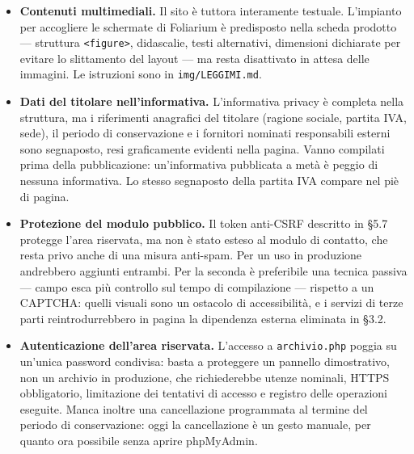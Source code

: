 \documentclass[
  11pt,
]{article}
\providecommand{\tightlist}{%
  \setlength{\itemsep}{0pt}\setlength{\parskip}{0pt}}
\begin{document}
\begin{itemize}
\tightlist
\item
  \textbf{Contenuti multimediali.} Il sito è tuttora interamente
  testuale. L'impianto per accogliere le schermate di Foliarium è
  predisposto nella scheda prodotto --- struttura
  \texttt{\textless{}figure\textgreater{}}, didascalie, testi
  alternativi, dimensioni dichiarate per evitare lo slittamento del
  layout --- ma resta disattivato in attesa delle immagini. Le
  istruzioni sono in \texttt{img/LEGGIMI.md}.
\item
  \textbf{Dati del titolare nell'informativa.} L'informativa privacy è
  completa nella struttura, ma i riferimenti anagrafici del titolare
  (ragione sociale, partita IVA, sede), il periodo di conservazione e i
  fornitori nominati responsabili esterni sono segnaposto, resi
  graficamente evidenti nella pagina. Vanno compilati prima della
  pubblicazione: un'informativa pubblicata a metà è peggio di nessuna
  informativa. Lo stesso segnaposto della partita IVA compare nel piè di
  pagina.
\item
  \textbf{Protezione del modulo pubblico.} Il token anti-CSRF descritto
  in §5.7 protegge l'area riservata, ma non è stato esteso al modulo di
  contatto, che resta privo anche di una misura anti-spam. Per un uso in
  produzione andrebbero aggiunti entrambi. Per la seconda è preferibile
  una tecnica passiva --- campo esca più controllo sul tempo di
  compilazione --- rispetto a un CAPTCHA: quelli visuali sono un
  ostacolo di accessibilità, e i servizi di terze parti
  reintrodurrebbero in pagina la dipendenza esterna eliminata in §3.2.
\item
  \textbf{Autenticazione dell'area riservata.} L'accesso a
  \texttt{archivio.php} poggia su un'unica password condivisa: basta a
  proteggere un pannello dimostrativo, non un archivio in produzione,
  che richiederebbe utenze nominali, HTTPS obbligatorio, limitazione dei
  tentativi di accesso e registro delle operazioni eseguite. Manca
  inoltre una cancellazione programmata al termine del periodo di
  conservazione: oggi la cancellazione è un gesto manuale, per quanto
  ora possibile senza aprire phpMyAdmin.
\end{itemize}
\end{document}
